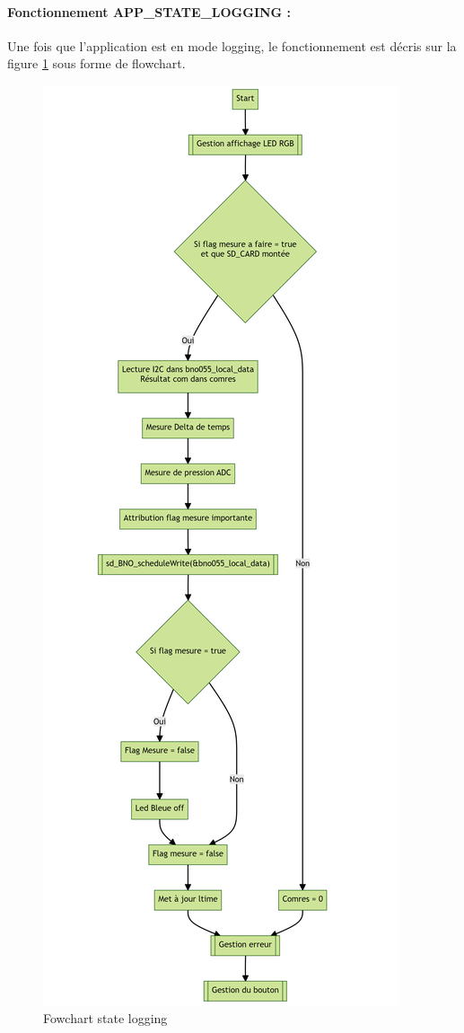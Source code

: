 {	\clearpage
	
	\paragraph{Fonctionnement APP\_STATE\_LOGGING :} Une fois que l'application est en mode logging, le fonctionnement est décris sur la figure \ref{fig:appstatelogging} sous forme de flowchart.
	
	\begin{figure}[h]
		\centering
		\includegraphics[width=0.446\linewidth]{Figures/Dev-SOFT/app_state_logging}
		\caption{Fowchart state logging}
		\label{fig:appstatelogging}
	\end{figure}

	\clearpage
	

}

